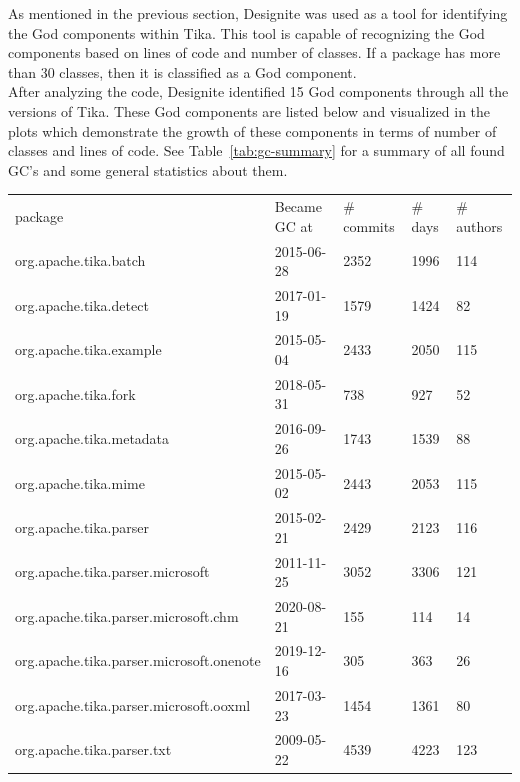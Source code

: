 \documentclass{article}
\begin{document}
As mentioned in the previous section, Designite was used as a tool for identifying the God components within Tika. This tool is capable of recognizing the God components based on lines of code and number of classes. If a package has more than 30 classes, then it is classified as a God component.\\
After analyzing the code, Designite identified 15 God components through all the versions of Tika. These God components are listed below and visualized in the plots which demonstrate the growth of these components in terms of number of classes and lines of code. See Table~\ref{tab:gc-summary} for a summary of all found GC's and some general statistics about them.

\begin{table}[ht]
\begin{tabular}{lllll}
package                                  & Became GC at & \# commits & \# days & \# authors \\
org.apache.tika.batch                    & 2015-06-28   & 2352          & 1996       & 114        \\
org.apache.tika.detect                   & 2017-01-19   & 1579          & 1424       & 82         \\
org.apache.tika.example                  & 2015-05-04   & 2433          & 2050       & 115        \\
org.apache.tika.fork                     & 2018-05-31   & 738           & 927        & 52         \\
org.apache.tika.metadata                 & 2016-09-26   & 1743          & 1539       & 88         \\
org.apache.tika.mime                     & 2015-05-02   & 2443          & 2053       & 115        \\
org.apache.tika.parser                   & 2015-02-21   & 2429          & 2123       & 116        \\
org.apache.tika.parser.microsoft         & 2011-11-25   & 3052          & 3306       & 121        \\
org.apache.tika.parser.microsoft.chm     & 2020-08-21   & 155           & 114        & 14         \\
org.apache.tika.parser.microsoft.onenote & 2019-12-16   & 305           & 363        & 26         \\
org.apache.tika.parser.microsoft.ooxml   & 2017-03-23   & 1454          & 1361       & 80         \\
org.apache.tika.parser.txt               & 2009-05-22   & 4539          & 4223       & 123        \\

\end{tabular}
\end{table}
\end{document}
